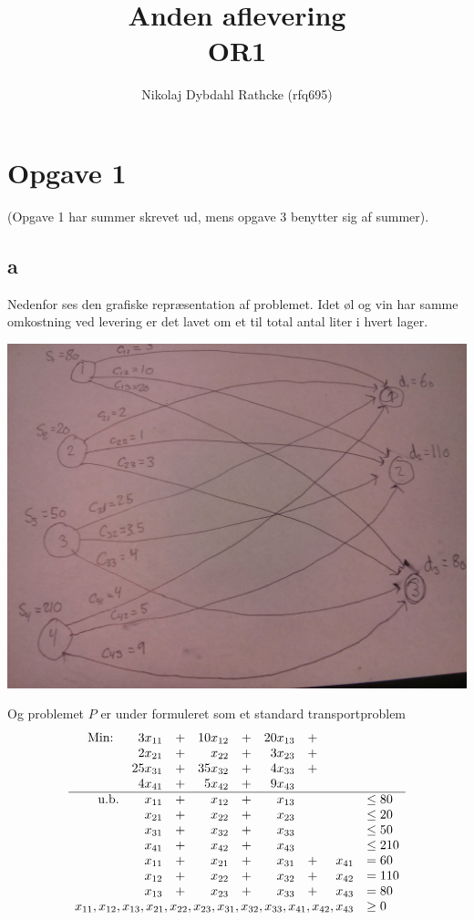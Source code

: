\documentclass[a4paper]{article}
\author{Nikolaj Dybdahl Rathcke (rfq695)}
\title{Anden aflevering \\ OR1}
\begin{document}
\maketitle
\section*{Opgave 1}
(Opgave 1 har summer skrevet ud, mens opgave 3 benytter sig af summer).
\subsection*{a}
Nedenfor ses den grafiske repræsentation af problemet. Idet øl og vin har samme omkostning ved levering er det lavet om et til total antal liter i hvert lager.
\begin{center}
\includegraphics[scale=0.1]{img1}
\end{center}
Og problemet $P$ er under formuleret som et standard transportproblem  
\begin{equation}
\begin{array}{rrrrrrrrrl}
&\text{Min: } & 3x_{11} & + & 10x_{12} & + & 20x_{13} & + && \\
& &2x_{21} & + & x_{22} & + & 3x_{23} & + &&\\
& &25x_{31} & + & 35x_{32} & + & 4x_{33} & + &&\\
& &4x_{41} & + & 5x_{42} & + & 9x_{43} & &&\\
\hline
&\text{u.b.} & x_{11} & + & x_{12} & +  & x_{13} &&& \leq 80 \\
& & x_{21} & + & x_{22} & +  & x_{23} & & &\leq 20 \\
& & x_{31} & + & x_{32} & +  & x_{33} & & &\leq 50 \\
& & x_{41} & + & x_{42} & +  & x_{43} & & & \leq 210 \\
& & x_{11} & + & x_{21} & +  & x_{31} & + & x_{41} & = 60 \\
& & x_{12} & + & x_{22} & +  & x_{32} & + & x_{42} & = 110 \\
& & x_{13} & + & x_{23} & +  & x_{33} & + & x_{43} & = 80 \\
\multicolumn{9}{r} {x_{11},x_{12},x_{13},x_{21},x_{22},x_{23},x_{31},x_{32},x_{33},x_{41},x_{42}, x_{43}} & \geq 0
\end{array}
\end{equation}
\newpage
\end{document}
